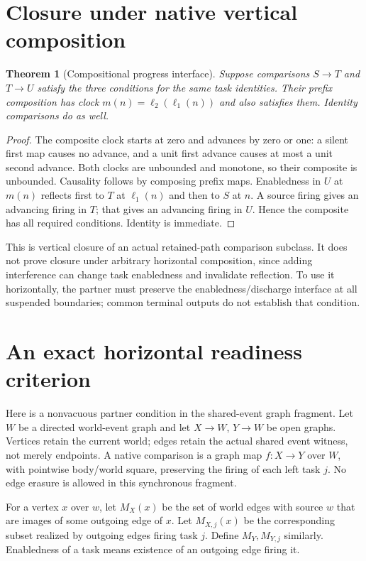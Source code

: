 \documentclass[11pt]{article}
\newtheorem{theorem}{Theorem}\newtheorem{proposition}{Proposition}
\begin{document}
\section{Closure under native vertical composition}
\begin{theorem}[Compositional progress interface]
Suppose comparisons $S\to T$ and $T\to U$ satisfy the three conditions for the same task identities. Their prefix composition has clock $m(n)=\ell_2(\ell_1(n))$ and also satisfies them. Identity comparisons do as well.
\end{theorem}
\begin{proof}
The composite clock starts at zero and advances by zero or one: a silent first map causes no advance, and a unit first advance causes at most a unit second advance. Both clocks are unbounded and monotone, so their composite is unbounded. Causality follows by composing prefix maps. Enabledness in $U$ at $m(n)$ reflects first to $T$ at $\ell_1(n)$ and then to $S$ at $n$. A source firing gives an advancing firing in $T$; that gives an advancing firing in $U$. Hence the composite has all required conditions. Identity is immediate.
\end{proof}

This is vertical closure of an actual retained-path comparison subclass. It does not prove closure under arbitrary horizontal composition, since adding interference can change task enabledness and invalidate reflection. To use it horizontally, the partner must preserve the enabledness/discharge interface at all suspended boundaries; common terminal outputs do not establish that condition.

\section{An exact horizontal readiness criterion}
Here is a nonvacuous partner condition in the shared-event graph fragment. Let $W$ be a directed world-event graph and let $X\to W$, $Y\to W$ be open graphs. Vertices retain the current world; edges retain the actual shared event witness, not merely endpoints. A native comparison is a graph map $f:X\to Y$ over $W$, with pointwise body/world square, preserving the firing of each left task $j$. No edge erasure is allowed in this synchronous fragment.

For a vertex $x$ over $w$, let $M_X(x)$ be the set of world edges with source $w$ that are images of some outgoing edge of $x$. Let $M_{X,j}(x)$ be the corresponding subset realized by outgoing edges firing task $j$. Define $M_Y,M_{Y,j}$ similarly. Enabledness of a task means existence of an outgoing edge firing it.
\end{document}
